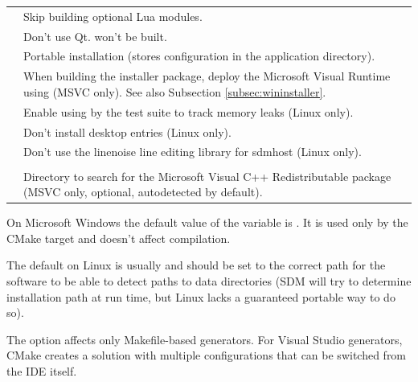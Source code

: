 \documentclass[a4paper,12pt,twoside,extrafontsizes]{memoir}
\begin{document}
\begin{table}[htbp]
\begin{tabularx}{\textwidth}{lL}
 & Skip building optional Lua modules. \\

 & Don't use Qt.  won't be built. \\

 & Portable installation (stores configuration in the application directory). \\

 & When building the installer package, deploy the Microsoft Visual \cplusplus{} Runtime using  (MSVC only). See also Subsection \ref{subsec:wininstaller}. \\

 & Enable using  by the test suite to track memory leaks (Linux only). \\

 & Don't install desktop entries (Linux only). \\

 & Don't use the linenoise line editing library for sdmhost (Linux only). \\

\midrule
{}\\
\midrule

 & Directory to search for the Microsoft Visual C++ Redistributable package (MSVC only, optional, autodetected by default).\\

\bottomrule
\end{tabularx}
\end{table}

On Microsoft Windows the default value of the  variable is . It is used only by the CMake  target and doesn't affect compilation.

The default  on Linux is usually  and should be set to the correct path for the software to be able to detect paths to data directories (SDM will try to determine installation path at run time, but Linux lacks a guaranteed portable way to do so).

The  option affects only Makefile-based generators. For Visual Studio generators, CMake creates a solution with multiple configurations that can be switched from the IDE itself.
\end{document}

